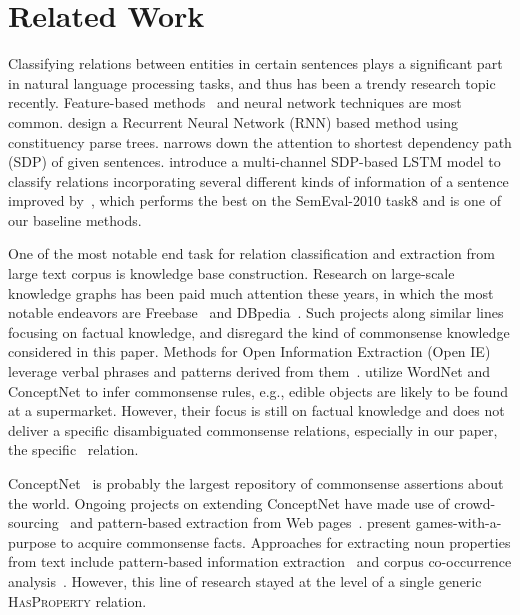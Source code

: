 \section{Related Work}
Classifying relations between entities in certain sentences plays a significant part in natural language processing tasks, and thus has been a trendy research topic recently.
Feature-based methods~\cite{sem} and neural network techniques are most common. 
\cite{socher2011semi} design a Recurrent Neural Network (RNN) based method using constituency parse trees. \cite{ebrahimi2015chain} narrows down the attention to shortest dependency path (SDP) of given sentences. 
\cite{xu2015classifying} introduce a multi-channel SDP-based LSTM model to classify relations incorporating several different kinds of information of a sentence improved by~\cite{xu2016improved}, which performs the best on the SemEval-2010 task8 and is one of our baseline methods.


One of the most notable end task for relation classification and extraction from large text corpus is knowledge base construction.
Research on large-scale knowledge graphs has been paid much attention these years, in which the most notable endeavors are Freebase~\cite{bollacker2008freebase} and DBpedia~\cite{auer2007dbpedia}. 
Such projects along similar lines focusing on factual knowledge, and disregard the kind of commonsense knowledge considered in this paper. 
Methods for Open Information Extraction (Open IE) leverage verbal phrases and patterns derived from them~\cite{fader2011identifying,del2013clausie}. \cite{blanco2011commonsense} utilize WordNet
and ConceptNet to infer commonsense rules, e.g., edible objects
are likely to be found at a supermarket. 
However, their focus is still on factual knowledge and does not deliver a specific disambiguated commonsense relations, especially in our paper, the specific \lnear~relation.

ConceptNet~\cite{speer2012representing} is probably the largest repository
of commonsense assertions about the world.
Ongoing projects on extending ConceptNet have made use of crowd-sourcing~\cite{havasi2007conceptnet,speer2010using}
and pattern-based extraction from Web pages~\cite{tandon2011deriving}. \cite{von2006verbosity,herdaugdelen2012bootstrapping} present games-with-a-purpose to acquire commonsense
facts. Approaches for extracting noun properties from text include
pattern-based information extraction~\cite{almuhareb2004attribute} and corpus co-occurrence
analysis~\cite{baroni2010nouns}. However, this line of research stayed
at the level of a single generic \textsc{HasProperty} relation.

